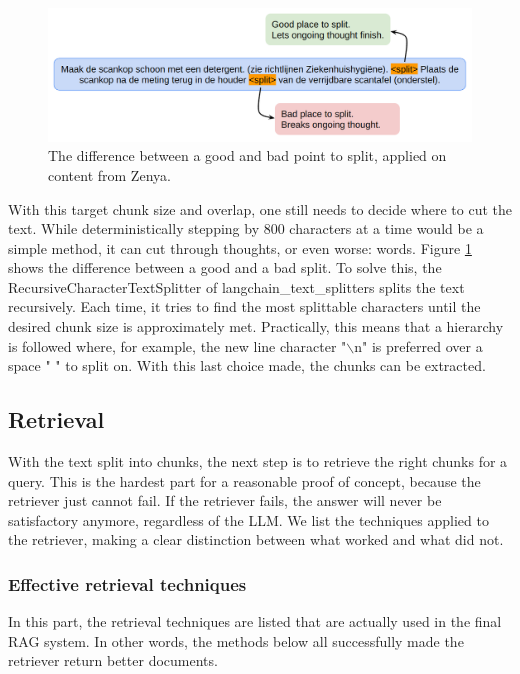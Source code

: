 \begin{figure}[h]
    \captionsetup{justification=centering}
    \centerline{\includegraphics[width=1\linewidth]{fig/good_split_bad_split.png}}
    \caption{The difference between a good and bad point to split, applied on content from Zenya.}
    \label{fig:good_split_bad_split}
\end{figure}

With this target chunk size and overlap, one still needs to decide where to cut the text. While deterministically stepping by 800 characters at a time would be a simple method, it can cut through thoughts, or even worse: words. Figure \ref{fig:good_split_bad_split} shows the difference between a good and a bad split. To solve this, the RecursiveCharacterTextSplitter of langchain\_text\_splitters \cite{langchain2025recursivecharactertextsplitter} splits the text recursively. Each time, it tries to find the most splittable characters until the desired chunk size is approximately met. Practically, this means that a hierarchy is followed where, for example, the new line character "$\backslash$n" is preferred over a space " " to split on. With this last choice made, the chunks can be extracted.

\subsection{Retrieval}
With the text split into chunks, the next step is to retrieve the right chunks for a query. This is the hardest part for a reasonable proof of concept, because the retriever just cannot fail. If the retriever fails, the answer will never be satisfactory anymore, regardless of the LLM. We list the techniques applied to the retriever, making a clear distinction between what worked and what did not.

\subsubsection{Effective retrieval techniques}
In this part, the retrieval techniques are listed that are actually used in the final RAG system. In other words, the methods below all successfully made the retriever return better documents.

